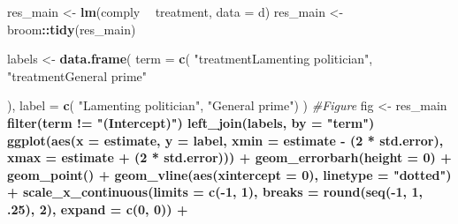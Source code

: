 \documentclass[]{book}
\newenvironment{Shaded}{\begin{snugshade}}{\end{snugshade}}
\newcommand{\KeywordTok}[1]{\textcolor[rgb]{0.13,0.29,0.53}{\textbf{#1}}}
\newcommand{\DataTypeTok}[1]{\textcolor[rgb]{0.13,0.29,0.53}{#1}}
\newcommand{\DecValTok}[1]{\textcolor[rgb]{0.00,0.00,0.81}{#1}}
\newcommand{\StringTok}[1]{\textcolor[rgb]{0.31,0.60,0.02}{#1}}
\newcommand{\CommentTok}[1]{\textcolor[rgb]{0.56,0.35,0.01}{\textit{#1}}}
\newcommand{\OperatorTok}[1]{\textcolor[rgb]{0.81,0.36,0.00}{\textbf{#1}}}
\newcommand{\NormalTok}[1]{#1}
\begin{document}
\begin{Shaded}
\begin{Highlighting}[]
\NormalTok{res_main <-}\StringTok{  }\KeywordTok{lm}\NormalTok{(comply }\OperatorTok{~}\StringTok{ }\NormalTok{treatment, }\DataTypeTok{data =}\NormalTok{ d) }
\NormalTok{res_main <-}\StringTok{ }\NormalTok{broom}\OperatorTok{::}\KeywordTok{tidy}\NormalTok{(res_main)}

\NormalTok{labels <-}\StringTok{ }\KeywordTok{data.frame}\NormalTok{(}
  \DataTypeTok{term =} \KeywordTok{c}\NormalTok{(}
    \StringTok{"treatmentLamenting politician"}\NormalTok{,}
    \StringTok{"treatmentGeneral prime"}
    
\NormalTok{  ),}
  \DataTypeTok{label =} \KeywordTok{c}\NormalTok{( }\StringTok{"Lamenting politician"}\NormalTok{,}
             \StringTok{"General prime"}\NormalTok{)}
\NormalTok{)}
\CommentTok{#Figure}
\NormalTok{fig <-}\StringTok{   }\NormalTok{res_main }\OperatorTok{%>%}
\StringTok{  }\KeywordTok{filter}\NormalTok{(term }\OperatorTok{!=}\StringTok{ "(Intercept)"}\NormalTok{) }\OperatorTok{%>%}\StringTok{ }
\StringTok{  }\KeywordTok{left_join}\NormalTok{(labels, }\DataTypeTok{by =} \StringTok{"term"}\NormalTok{) }\OperatorTok{%>%}\StringTok{ }
\StringTok{  }
\StringTok{  }\KeywordTok{ggplot}\NormalTok{(}\KeywordTok{aes}\NormalTok{(}\DataTypeTok{x =}\NormalTok{ estimate, }\DataTypeTok{y =}\NormalTok{ label,}
             \DataTypeTok{xmin =}\NormalTok{ estimate }\OperatorTok{-}\StringTok{ }\NormalTok{(}\DecValTok{2} \OperatorTok{*}\StringTok{ }\NormalTok{std.error),}
             \DataTypeTok{xmax =}\NormalTok{ estimate }\OperatorTok{+}\StringTok{ }\NormalTok{(}\DecValTok{2} \OperatorTok{*}\StringTok{ }\NormalTok{std.error))) }\OperatorTok{+}
\StringTok{   }\KeywordTok{geom_errorbarh}\NormalTok{(}\DataTypeTok{height =} \DecValTok{0}\NormalTok{) }\OperatorTok{+}
\StringTok{  }\KeywordTok{geom_point}\NormalTok{() }\OperatorTok{+}
\StringTok{  }\KeywordTok{geom_vline}\NormalTok{(}\KeywordTok{aes}\NormalTok{(}\DataTypeTok{xintercept =} \DecValTok{0}\NormalTok{), }\DataTypeTok{linetype =} \StringTok{"dotted"}\NormalTok{) }\OperatorTok{+}
\StringTok{  }\KeywordTok{scale_x_continuous}\NormalTok{(}\DataTypeTok{limits =} \KeywordTok{c}\NormalTok{(}\OperatorTok{-}\DecValTok{1}\NormalTok{, }\DecValTok{1}\NormalTok{),}
                     \DataTypeTok{breaks =} \KeywordTok{round}\NormalTok{(}\KeywordTok{seq}\NormalTok{(}\OperatorTok{-}\DecValTok{1}\NormalTok{, }\DecValTok{1}\NormalTok{, .}\DecValTok{25}\NormalTok{), }\DecValTok{2}\NormalTok{),}
                     \DataTypeTok{expand =} \KeywordTok{c}\NormalTok{(}\DecValTok{0}\NormalTok{, }\DecValTok{0}\NormalTok{)) }\OperatorTok{+}
}}}
\end{Highlighting}
\end{Shaded}
\end{document}
